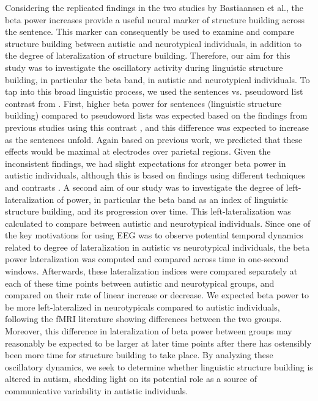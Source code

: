 Considering the replicated findings in the two studies by Bastiaansen et al., the beta power increases provide a useful neural marker of structure building across the sentence. This marker can consequently be used to examine and compare structure building between autistic and neurotypical individuals, in addition to the degree of lateralization of structure building. Therefore, our aim for this study was to investigate the oscillatory activity during linguistic structure building, in particular the beta band, in autistic and neurotypical individuals. To tap into this broad linguistic process, we used the sentences vs. pseudoword list contrast from \cite{jouravlev2020}. First, higher beta power for sentences (linguistic structure building) compared to pseudoword lists was expected based on the findings from previous studies using this contrast \citep{bastiaansen2010,bastiaansen2015}, and this difference was expected to increase as the sentences unfold. Again based on previous work, we predicted that these effects would be maximal at electrodes over parietal regions. Given the inconsistent findings, we had slight expectations for stronger beta power in autistic individuals, although this is based on findings using different techniques and contrasts \citep{philip2012}. A second aim of our study was to investigate the degree of left-lateralization of power, in particular the beta band as an index of linguistic structure building, and its progression over time. This left-lateralization was calculated to compare between autistic and neurotypical individuals. Since one of the key motivations for using EEG was to observe potential temporal dynamics related to degree of lateralization in autistic vs neurotypical individuals, the beta power lateralization was computed and compared across time in one-second windows. Afterwards, these lateralization  indices were compared separately at each of these time points between autistic and neurotypical groups, and compared on their rate of linear increase or decrease. We expected beta power to be more left-lateralized in neurotypicals compared to autistic individuals, following the fMRI literature showing differences between the two groups. Moreover, this difference in lateralization of beta power between groups may reasonably be expected to be larger at later time points after there has ostensibly been more time for structure building to take place. By analyzing these oscillatory dynamics, we seek to determine whether linguistic structure building is altered in autism, shedding light on its potential role as a source of communicative variability in autistic individuals.


